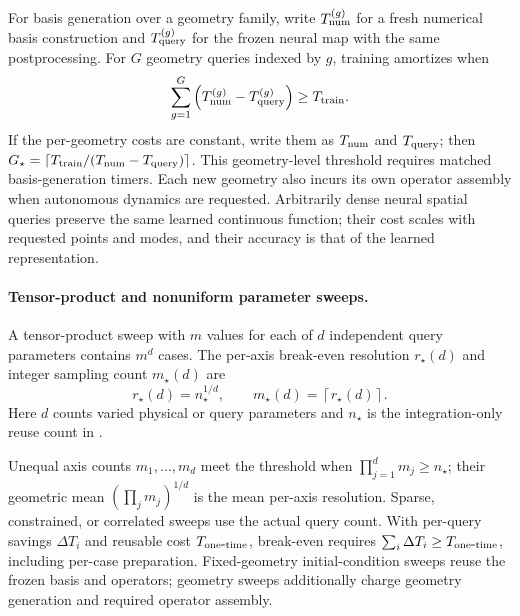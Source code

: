 For basis generation over a geometry family, write $T_{\rm num}^{(g)}$ for a fresh numerical basis construction and $T_{\rm query}^{(g)}$ for the frozen neural map with the same postprocessing. For $G$ geometry queries indexed by $g$, training amortizes when
\begin{equation}
\sum_{g=1}^{G}\left(T_{\rm num}^{(g)}-T_{\rm query}^{(g)}\right)\geq T_{\rm train}.
\end{equation}
If the per-geometry costs are constant, write them as $T_{\rm num}$ and $T_{\rm query}$; then $G_\star=\lceil T_{\rm train}/(T_{\rm num}-T_{\rm query})\rceil$. This geometry-level threshold requires matched basis-generation timers. Each new geometry also incurs its own operator assembly when autonomous dynamics are requested. Arbitrarily dense neural spatial queries preserve the same learned continuous function; their cost scales with requested points and modes, and their accuracy is that of the learned representation.



\paragraph{Tensor-product and nonuniform parameter sweeps.}
A tensor-product sweep with $m$ values for each of $d$ independent query parameters contains $m^d$ cases. The per-axis break-even resolution $r_\star(d)$ and integer sampling count $m_\star(d)$ are
\begin{equation}
r_\star(d)=n_\star^{1/d},\qquad
m_\star(d)=\left\lceil r_\star(d)\right\rceil.
\label{eq:sweep-resolution}
\end{equation}
Here $d$ counts varied physical or query parameters and $n_\star$ is the integration-only reuse count in .


Unequal axis counts $m_1,\ldots,m_d$ meet the threshold when $\prod_{j=1}^d m_j\geq n_\star$; their geometric mean $(\prod_jm_j)^{1/d}$ is the mean per-axis resolution. Sparse, constrained, or correlated sweeps use the actual query count. With per-query savings $\Delta T_i$ and reusable cost $T_{\rm one\mbox{-}time}$, break-even requires $\sum_i\Delta T_i\geq T_{\rm one\mbox{-}time}$, including per-case preparation. Fixed-geometry initial-condition sweeps reuse the frozen basis and operators; geometry sweeps additionally charge geometry generation and required operator assembly.

